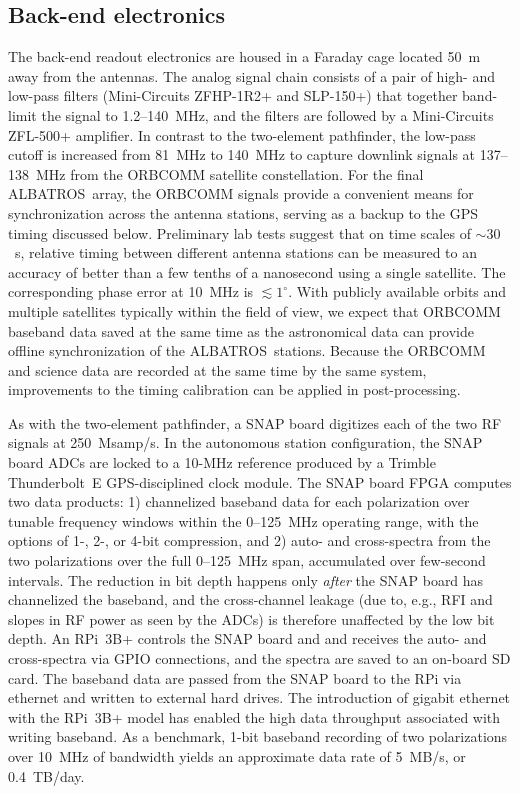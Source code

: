 \documentclass{ws-jai}
\def\albatros{ALBATROS}
\begin{document}
\subsection{Back-end electronics}\label{s:autonomous_backend}

The back-end readout electronics are housed in a Faraday cage located
50~m away from the antennas. The analog signal chain consists of a
pair of high- and low-pass filters (Mini-Circuits ZFHP-1R2+ and
SLP-150+) that together band-limit the signal to 1.2--140~MHz, and the
filters are followed by a Mini-Circuits ZFL-500+ amplifier.  In
contrast to the two-element pathfinder, the low-pass cutoff is
increased from 81~MHz to 140~MHz to capture downlink signals at
137--138~MHz from the ORBCOMM satellite constellation.  For the final
\albatros\ array, the ORBCOMM signals provide a convenient means for
synchronization across the antenna stations, serving as a backup to
the GPS timing discussed below.  Preliminary lab tests suggest that on
time scales of $\sim30$~s, relative timing between different antenna
stations can be measured to an accuracy of better than a few tenths of
a nanosecond using a single satellite.  The corresponding phase error
at 10~MHz is $\lesssim1^\circ$.  With publicly available orbits and
multiple satellites typically within the field of view, we expect that
ORBCOMM baseband data saved at the same time as the astronomical data
can provide offline synchronization of the \albatros\ stations.
Because the ORBCOMM and science data are recorded at the same time by
the same system, improvements to the timing calibration can be applied
in post-processing.

As with the two-element pathfinder, a SNAP board digitizes each of the
two RF signals at 250~Msamp/s. In the autonomous station
configuration, the SNAP board ADCs are locked to a 10-MHz reference
produced by a Trimble Thunderbolt~E GPS-disciplined clock module.  The
SNAP board FPGA computes two data products: 1) channelized baseband
data for each polarization over tunable frequency windows within the
0--125~MHz operating range, with the options of 1-, 2-, or 4-bit
compression, and 2) auto- and cross-spectra from the two polarizations
over the full 0--125~MHz span, accumulated over few-second intervals.
The reduction in bit depth happens only \textit{after} the SNAP board
has channelized the baseband, and the cross-channel leakage (due to,
e.g., RFI and slopes in RF power as seen by the ADCs) is therefore
unaffected by the low bit depth.  An RPi~3B+ controls the SNAP board
and and receives the auto- and cross-spectra via GPIO connections, and
the spectra are saved to an on-board SD card.  The baseband data are
passed from the SNAP board to the RPi via ethernet and written to
external hard drives.  The introduction of gigabit ethernet with the
RPi~3B+ model has enabled the high data throughput associated with
writing baseband.  As a benchmark, 1-bit baseband recording of two
polarizations over 10~MHz of bandwidth yields an approximate data rate
of 5~MB/s, or 0.4~TB/day.
\end{document}
